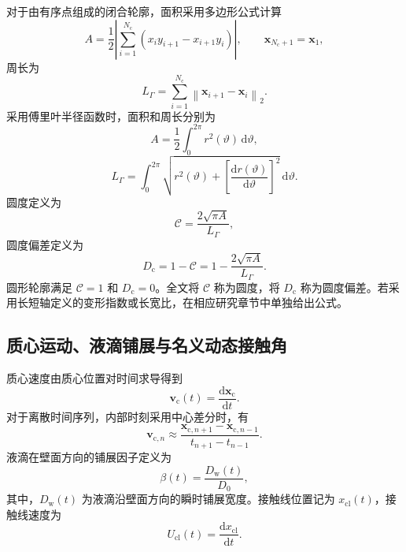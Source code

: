 对于由有序点组成的闭合轮廓，面积采用多边形公式计算
\begin{equation}
A
=
\frac{1}{2}
\left|
\sum_{i=1}^{N_{\mathrm c}}
\left(x_i y_{i+1}-x_{i+1}y_i\right)
\right|,
\qquad
\boldsymbol{x}_{N_{\mathrm c}+1}=\boldsymbol{x}_1,
\label{eq:ch2_polygon_area}
\end{equation}
周长为
\begin{equation}
L_{\Gamma}
=
\sum_{i=1}^{N_{\mathrm c}}
\left\|
\boldsymbol{x}_{i+1}-\boldsymbol{x}_i
\right\|_2.
\label{eq:ch2_polygon_perimeter}
\end{equation}
采用傅里叶半径函数时，面积和周长分别为
\begin{equation}
A
=
\frac{1}{2}
\int_0^{2\pi}
r^2(\vartheta)\,\mathrm d\vartheta,
\label{eq:ch2_fourier_area}
\end{equation}
\begin{equation}
L_{\Gamma}
=
\int_0^{2\pi}
\sqrt{
r^2(\vartheta)
+
\left[
\frac{\mathrm dr(\vartheta)}{\mathrm d\vartheta}
\right]^2}
\,\mathrm d\vartheta.
\label{eq:ch2_fourier_perimeter}
\end{equation}
圆度定义为
\begin{equation}
\mathcal{C}
=
\frac{2\sqrt{\pi A}}{L_{\Gamma}},
\label{eq:ch2_circularity}
\end{equation}
圆度偏差定义为
\begin{equation}
D_{\mathrm c}
=
1-\mathcal{C}
=
1-
\frac{2\sqrt{\pi A}}{L_{\Gamma}}.
\label{eq:ch2_circularity_deviation}
\end{equation}
圆形轮廓满足 $\mathcal{C}=1$ 和 $D_{\mathrm c}=0$。全文将 $\mathcal{C}$ 称为圆度，将 $D_{\mathrm c}$ 称为圆度偏差。若采用长短轴定义的变形指数或长宽比，在相应研究章节中单独给出公式。

\subsection{质心运动、液滴铺展与名义动态接触角}

质心速度由质心位置对时间求导得到
\begin{equation}
\boldsymbol{v}_{\mathrm c}(t)
=
\frac{\mathrm d\boldsymbol{x}_{\mathrm c}}{\mathrm dt}.
\label{eq:ch2_centroid_velocity}
\end{equation}
对于离散时间序列，内部时刻采用中心差分时，有
\begin{equation}
\boldsymbol{v}_{\mathrm c,n}
\approx
\frac{
\boldsymbol{x}_{\mathrm c,n+1}
-
\boldsymbol{x}_{\mathrm c,n-1}}
{t_{n+1}-t_{n-1}}.
\label{eq:ch2_centroid_velocity_discrete}
\end{equation}
液滴在壁面方向的铺展因子定义为
\begin{equation}
\beta(t)
=
\frac{D_{\mathrm w}(t)}{D_0},
\label{eq:ch2_spreading_factor}
\end{equation}
其中，$D_{\mathrm w}(t)$ 为液滴沿壁面方向的瞬时铺展宽度。接触线位置记为 $x_{\mathrm{cl}}(t)$，接触线速度为
\begin{equation}
U_{\mathrm{cl}}(t)
=
\frac{\mathrm dx_{\mathrm{cl}}}{\mathrm dt}.
\label{eq:ch2_contact_line_velocity}
\end{equation}

